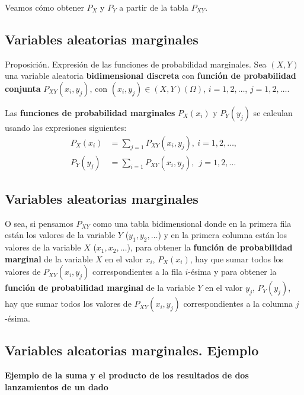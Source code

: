 \documentclass[]{book}
\begin{document}
Veamos cómo obtener \(P_X\) y \(P_Y\) a partir de la tabla \(P_{XY}\).

\hypertarget{variables-aleatorias-marginales-1}{%
\subsection{Variables aleatorias marginales}\label{variables-aleatorias-marginales-1}}

Proposición. Expresión de las funciones de probabilidad marginales.
Sea \((X,Y)\) una variable aleatoria \textbf{bidimensional discreta} con \textbf{función de probabilidad conjunta} \(P_{XY}(x_i,y_j)\), con \((x_i,y_j)\in (X,Y)(\Omega)\), \(i=1,2,\ldots\), \(j=1,2,\ldots\).

Las \textbf{funciones de probabilidad marginales} \(P_X(x_i)\) y \(P_Y(y_j)\) se calculan usando las expresiones siguientes:
\[
\begin{array}{rl}
P_X(x_i)  & = \sum_{j=1} P_{XY}(x_i,y_j),\  i=1,2,\ldots,\\ P_Y(y_j) &  = \sum_{i=1} P_{XY}(x_i,y_j),\ \ j=1,2,\ldots
\end{array}
\]

\hypertarget{variables-aleatorias-marginales-2}{%
\subsection{Variables aleatorias marginales}\label{variables-aleatorias-marginales-2}}

O sea, si pensamos \(P_{XY}\) como una tabla bidimensional donde en la primera fila están los valores de la variable \(Y\) (\(y_1,y_2,\ldots\)) y en la primera columna están los valores de la variable \(X\) (\(x_1,x_2,\ldots\)), para obtener la \textbf{función de probabilidad marginal} de la variable \(X\) en el valor \(x_i\), \(P_X(x_i)\), hay que sumar todos los valores de \(P_{XY}(x_i,y_j)\) correspondientes a la fila \(i\)-ésima y para obtener la \textbf{función de probabilidad marginal} de la variable \(Y\) en el valor \(y_j\), \(P_Y(y_j)\), hay que sumar todos los valores de \(P_{XY}(x_i,y_j)\) correspondientes a la columna \(j\)-ésima.

\hypertarget{variables-aleatorias-marginales.-ejemplo}{%
\subsection{Variables aleatorias marginales. Ejemplo}\label{variables-aleatorias-marginales.-ejemplo}}

\textbf{Ejemplo de la suma y el producto de los resultados de dos lanzamientos de un dado}
\end{document}
